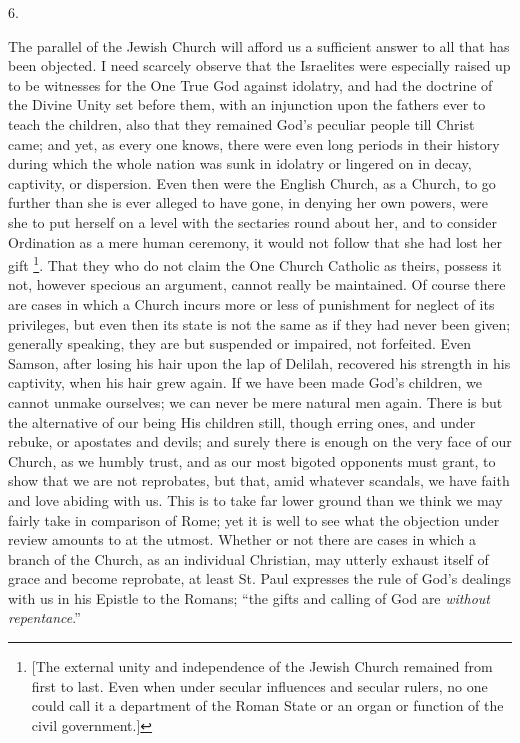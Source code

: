 6.

The parallel of the Jewish Church will afford us a sufficient
answer to all that has been objected. I need scarcely observe that the
Israelites were especially raised up to be witnesses for the One True
God against idolatry, and had the doctrine of the Divine Unity set
before them, with an injunction upon the fathers ever to teach the
children, also that they remained God's peculiar people till Christ
came; and yet, as every one knows, there were even long periods in
their history during which the whole nation was sunk in idolatry or
lingered on in decay, captivity, or dispersion. Even then were the
English Church, as a Church, to go further than she is ever alleged to
have gone, in denying her own powers, were she to put herself on a
level with the sectaries round about her, and to consider Ordination
as a mere human ceremony, it would not follow that she had lost her
gift \footnote{[The external unity and independence of the
Jewish Church remained from first to last. Even when under secular
influences and secular rulers, no one could call it a department of
the Roman State or an organ or function of the civil government.]}. That they who do
not claim the One Church Catholic as theirs, possess it not, however
specious an argument, cannot really be maintained. Of course there are
cases in which a Church incurs more or less of punishment for neglect
of its privileges, but even then its state is not the same as if they
had never been given; generally speaking, they are but suspended or
impaired, not forfeited. Even Samson, after losing his hair upon the
lap of Delilah, recovered his strength in his captivity, when his hair
grew again. If we have been made God's children, we cannot unmake
ourselves; we can never be mere natural men again. There is but the
alternative of our being His children still, though erring ones, and
under rebuke, or apostates and devils; and surely there is
enough on the very face of our Church, as we humbly trust, and as our
most bigoted opponents must grant, to show that we are not reprobates,
but that, amid whatever scandals, we have faith and love abiding with
us. This is to take far lower ground than we think we may fairly take
in comparison of Rome; yet it is well to see what the objection under
review amounts to at the utmost. Whether or not there are cases in
which a branch of the Church, as an individual Christian, may utterly
exhaust itself of grace and become reprobate, at least St. Paul
expresses the rule of God's dealings with us in his Epistle to the
Romans; ``the gifts and calling of God are \emph{without repentance}.''
